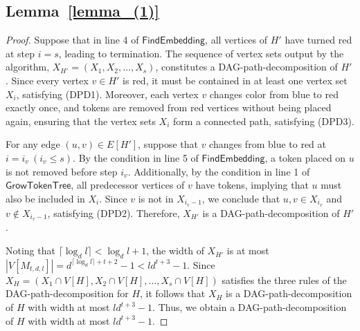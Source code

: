 \documentclass[runningheads]{llncs}
\theoremstyle{plain}
\theoremstyle{definition}
\begin{document}
\subsection{\textbf{Lemma~\ref{lemma_(1)}}}\label{appendix_D4}
\begin{proof}
    Suppose that in line 4 of $\mathsf{FindEmbedding}$, all vertices of $H'$ have turned red at step $i=s$, leading to termination. The sequence of vertex sets output by the algorithm, $X_{H'} = (X_1, X_2, \dots , X_s)$, constitutes a DAG-path-decomposition of $H'$. Since every vertex $v \in H'$ is red, it must be contained in at least one vertex set $X_i$, satisfying (DPD1). Moreover, each vertex $v$ changes color from blue to red exactly once, and tokens are removed from red vertices without being placed again, ensuring that the vertex sets $X_i$ form a connected path, satisfying (DPD3).

    For any edge $(u, v) \in E[H']$, suppose that $v$ changes from blue to red at $i=i_v~ (i_v \leq s)$. By the condition in line 5 of $\mathsf{FindEmbedding}$, a token placed on $u$ is not removed before step $i_v$. Additionally, by the condition in line 1 of $\mathsf{GrowTokenTree}$, all predecessor vertices of $v$ have tokens, implying that $u$ must also be included in $X_i$. Since $v$ is not in $X_{i_v-1}$, we conclude that $u, v \in X_{i_v}$ and $v \notin X_{i_v-1}$, satisfying (DPD2). Therefore, $X_{H'}$ is a DAG-path-decomposition of $H'$.

    Noting that $\lceil \log_d l \rceil < \log_d l +1$, the width of $X_{H'}$ is at most $|V[M_{t, d, l}]| = d^{\lceil \log_d l \rceil +t+2}-1 < ld^{t+3}-1$. Since $X_H = (X_1 \cap V[H], X_2 \cap V[H], \dots , X_s \cap V[H])$ satisfies the three rules of the DAG-path-decomposition for $H$, it follows that $X_H$ is a DAG-path-decomposition of $H$ with width at most $ld^{t+3}-1$. Thus, we obtain a DAG-path-decomposition of $H$ with width at most $ld^{t+3}-1$.
\end{proof}
\end{document}
